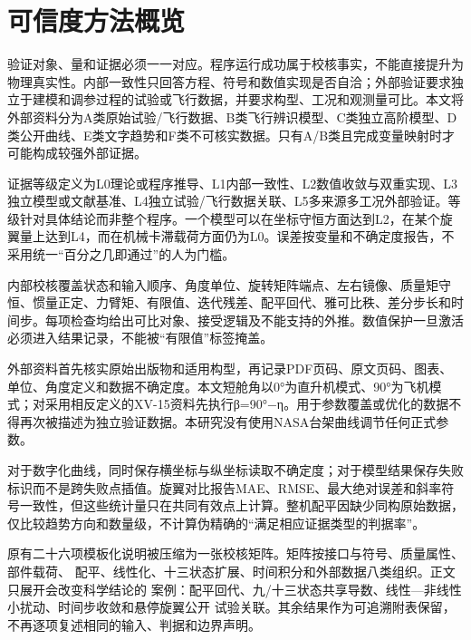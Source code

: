 \documentclass[UTF8,12pt,oneside,openany,fontset=windows]{ctexbook}
\begin{document}
\section{可信度方法概览}

验证对象、量和证据必须一一对应。程序运行成功属于校核事实，不能直接提升为物理真实性。内部一致性只回答方程、符号和数值实现是否自洽；外部验证要求独立于建模和调参过程的试验或飞行数据，并要求构型、工况和观测量可比。本文将外部资料分为A类原始试验/飞行数据、B类飞行辨识模型、C类独立高阶模型、D类公开曲线、E类文字趋势和F类不可核实数据。只有A/B类且完成变量映射时才可能构成较强外部证据。

证据等级定义为L0理论或程序推导、L1内部一致性、L2数值收敛与双重实现、L3独立模型或文献基准、L4独立试验/飞行数据关联、L5多来源多工况外部验证。等级针对具体结论而非整个程序。一个模型可以在坐标守恒方面达到L2，在某个旋翼量上达到L4，而在机械卡滞载荷方面仍为L0。误差按变量和不确定度报告，不采用统一“百分之几即通过”的人为门槛。

内部校核覆盖状态和输入顺序、角度单位、旋转矩阵端点、左右镜像、质量矩守恒、惯量正定、力臂矩、有限值、迭代残差、配平回代、雅可比秩、差分步长和时间步。每项检查均给出可比对象、接受逻辑及不能支持的外推。数值保护一旦激活必须进入结果记录，不能被“有限值”标签掩盖。

外部资料首先核实原始出版物和适用构型，再记录PDF页码、原文页码、图表、单位、角度定义和数据不确定度。本文短舱角以0°为直升机模式、90°为飞机模式；对采用相反定义的XV-15资料先执行β=90°−η。用于参数覆盖或优化的数据不得再次被描述为独立验证数据。本研究没有使用NASA台架曲线调节任何正式参数。

对于数字化曲线，同时保存横坐标与纵坐标读取不确定度；对于模型结果保存失败标识而不是跨失败点插值。旋翼对比报告MAE、RMSE、最大绝对误差和斜率符号一致性，但这些统计量只在共同有效点上计算。整机配平因缺少同构原始数据，仅比较趋势方向和数量级，不计算伪精确的“满足相应证据类型的判据率”。

原有二十六项模板化说明被压缩为一张校核矩阵。矩阵按接口与符号、质量属性、部件载荷、 配平、线性化、十三状态扩展、时间积分和外部数据八类组织。正文只展开会改变科学结论的 案例：配平回代、九/十三状态共享导数、线性—非线性小扰动、时间步收敛和悬停旋翼公开 试验关联。其余结果作为可追溯附表保留，不再逐项复述相同的输入、判据和边界声明。
\end{document}
